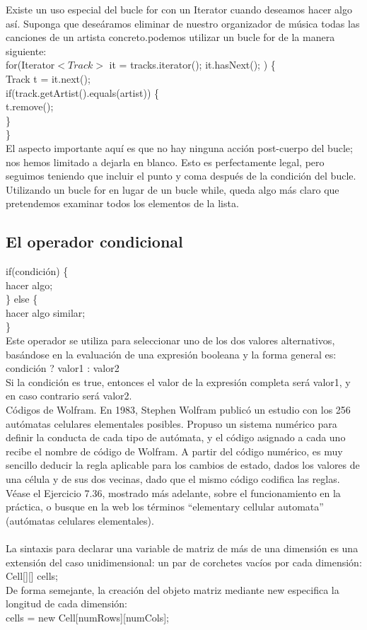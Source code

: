 \documentclass[11pt,a4paper]{article}
\begin{document}
Existe un uso especial del bucle for con un Iterator cuando
deseamos hacer algo así. Suponga que deseáramos eliminar de nuestro organizador de música
todas las canciones de un artista concreto.podemos utilizar un bucle for de la
manera siguiente:\\
for(Iterator$<Track>$ it = tracks.iterator(); it.hasNext(); ) \{\\
Track t = it.next();\\
if(track.getArtist().equals(artist)) \{\\
t.remove();\\
\}\\
\}\\
El aspecto importante aquí es que no hay ninguna acción post-cuerpo del bucle; nos hemos limitado
a dejarla en blanco. Esto es perfectamente legal, pero seguimos teniendo que incluir el punto
y coma después de la condición del bucle. Utilizando un bucle for en lugar de un bucle while,
queda algo más claro que pretendemos examinar todos los elementos de la lista.
\subsection{
El operador condicional}
if(condición) \{\\
	hacer algo;\\
\}
else \{\\
	hacer algo similar;\\
\}\\
Este operador se utiliza para seleccionar uno de los dos valores alternativos,
basándose en la evaluación de una expresión booleana y la forma general es:\\
condición ? valor1 : valor2\\
Si la condición es true, entonces el valor de la expresión completa será valor1, y en caso contrario
será valor2. 
\\
Códigos de Wolfram. En 1983, Stephen Wolfram publicó un estudio con los 256 autómatas
celulares elementales posibles. Propuso un sistema numérico para definir la conducta de cada tipo
de autómata, y el código asignado a cada uno recibe el nombre de código de Wolfram. A partir del
código numérico, es muy sencillo deducir la regla aplicable para los cambios de estado, dados los
valores de una célula y de sus dos vecinas, dado que el mismo código codifica las reglas. Véase el
Ejercicio 7.36, mostrado más adelante, sobre el funcionamiento en la práctica, o busque en la web los
términos “elementary cellular automata” (autómatas celulares elementales).\\
\\
La sintaxis para declarar una variable de matriz de más de una dimensión es una extensión del caso
unidimensional: un par de corchetes vacíos por cada dimensión:\\
Cell[][] cells;\\
De forma semejante, la creación del objeto matriz mediante new especifica la longitud de cada
dimensión:\\
cells = new Cell[numRows][numCols];
\end{document}
